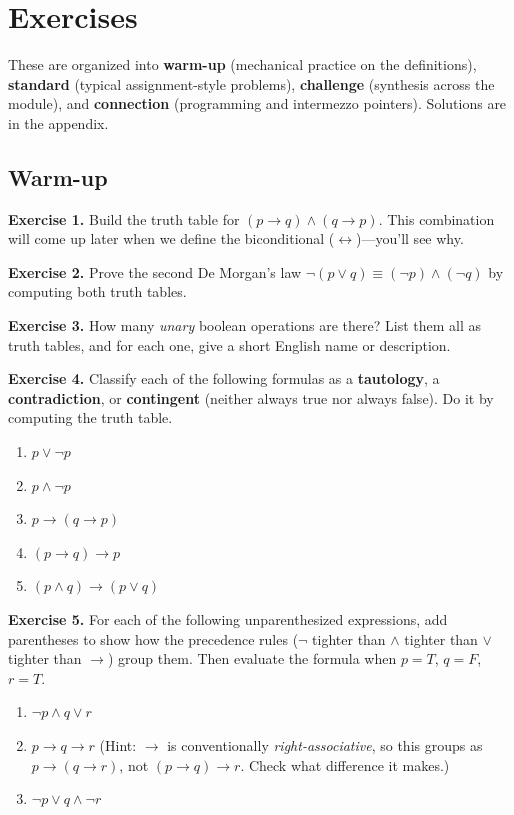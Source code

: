 \documentclass[11pt]{article}
\begin{document}
\section{Exercises}

These are organized into \textbf{warm-up} (mechanical practice on the definitions), \textbf{standard} (typical assignment-style problems), \textbf{challenge} (synthesis across the module), and \textbf{connection} (programming and intermezzo pointers). Solutions are in the appendix.

\subsection*{Warm-up}

\textbf{Exercise 1.}\label{ex:m2:1} Build the truth table for $(p \to q) \wedge (q \to p)$. This combination will come up later when we define the biconditional ($\leftrightarrow$)---you'll see why.

\bigskip
\textbf{Exercise 2.}\label{ex:m2:2} Prove the second De Morgan's law $\lnot(p \vee q) \equiv (\lnot p) \wedge (\lnot q)$ by computing both truth tables.

\bigskip
\textbf{Exercise 3.}\label{ex:m2:3} How many \emph{unary} boolean operations are there? List them all as truth tables, and for each one, give a short English name or description.

\bigskip
\textbf{Exercise 4.}\label{ex:m2:4} Classify each of the following formulas as a \textbf{tautology}, a \textbf{contradiction}, or \textbf{contingent} (neither always true nor always false). Do it by computing the truth table.
\begin{enumerate}[label=(\alph*)]
  \item $p \vee \lnot p$
  \item $p \wedge \lnot p$
  \item $p \to (q \to p)$
  \item $(p \to q) \to p$
  \item $(p \wedge q) \to (p \vee q)$
\end{enumerate}

\bigskip
\textbf{Exercise 5.}\label{ex:m2:5} For each of the following unparenthesized expressions, add parentheses to show how the precedence rules ($\lnot$ tighter than $\wedge$ tighter than $\vee$ tighter than $\to$) group them. Then evaluate the formula when $p = T$, $q = F$, $r = T$.
\begin{enumerate}[label=(\alph*)]
  \item $\lnot p \wedge q \vee r$
  \item $p \to q \to r$ \quad (Hint: $\to$ is conventionally \emph{right-associative}, so this groups as $p \to (q \to r)$, not $(p \to q) \to r$. Check what difference it makes.)
  \item $\lnot p \vee q \wedge \lnot r$
\end{enumerate}
\end{document}
